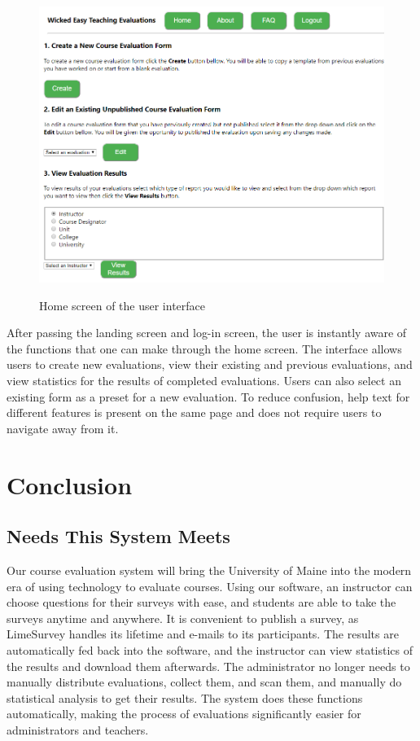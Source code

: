 \documentclass{article}
\begin{document}
\begin{center}
\begin{figure}[H]
    \centering
    {\includegraphics[scale=.6]{images/homeScreen.png}}
    \caption{Home screen of the user interface}
\end{figure}
\end{center}

After passing the landing screen and log-in screen, the user is instantly aware of the functions that one can make through the home screen. The interface allows users to create new evaluations, view their existing and previous evaluations, and view statistics for the results of completed evaluations. Users can also select an existing form as a preset for a new evaluation. To reduce confusion, help text for different features is present on the same page and does not require users to navigate away from it.

\newpage

\section{Conclusion}

\subsection{Needs This System Meets}

Our course evaluation system will bring the University of Maine into the modern era of using technology to evaluate courses. Using our software, an instructor can choose questions for their surveys with ease, and students are able to take the surveys anytime and anywhere. It is convenient to publish a survey, as LimeSurvey handles its lifetime and e-mails to its participants. The results are automatically fed back into the software, and the instructor can view statistics of the results and download them afterwards. The administrator no longer needs to manually distribute evaluations, collect them, and scan them, and manually do statistical analysis to get their results. The system does these functions automatically, making the process of evaluations significantly easier for administrators and teachers.
\end{document}
